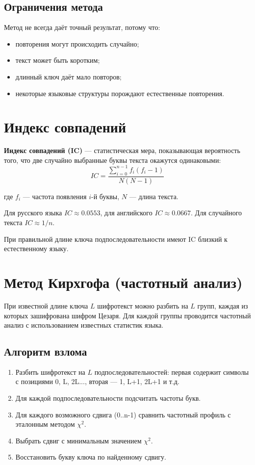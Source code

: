 \subsection*{Ограничения метода}

Метод не всегда даёт точный результат, потому что:
\begin{itemize}
    \item повторения могут происходить случайно;
    \item текст может быть коротким;
    \item длинный ключ даёт мало повторов;
    \item некоторые языковые структуры порождают естественные повторения.
\end{itemize}

\section*{Индекс совпадений}

\textbf{Индекс совпадений (IC)} --- статистическая мера, показывающая вероятность того, что две случайно выбранные буквы текста окажутся одинаковыми:
$$IC = \frac{\sum_{i=0}^{n-1} f_i(f_i - 1)}{N(N-1)}$$

где $f_i$ --- частота появления $i$-й буквы, $N$ --- длина текста.

Для русского языка $IC \approx 0.0553$, для английского $IC \approx 0.0667$. Для случайного текста $IC \approx 1/n$.

При правильной длине ключа подпоследовательности имеют IC близкий к естественному языку.

\section*{Метод Кирхгофа (частотный анализ)}

При известной длине ключа $L$ шифротекст можно разбить на $L$ групп, каждая из которых зашифрована шифром Цезаря. Для каждой группы проводится частотный анализ с использованием известных статистик языка.

\subsection*{Алгоритм взлома}

\begin{enumerate}
    \item Разбить шифротекст на $L$ подпоследовательностей: первая содержит символы с позициями 0, L, 2L..., вторая --- 1, L+1, 2L+1 и т.д.
    \item Для каждой подпоследовательности подсчитать частоты букв.
    \item Для каждого возможного сдвига (0..n-1) сравнить частотный профиль с эталонным методом $\chi^2$.
    \item Выбрать сдвиг с минимальным значением $\chi^2$.
    \item Восстановить букву ключа по найденному сдвигу.
\end{enumerate}

